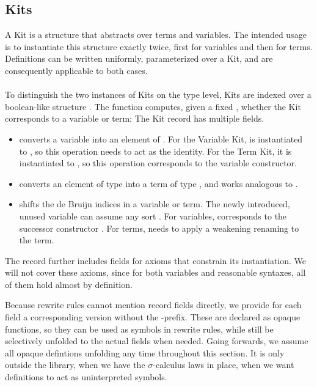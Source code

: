 \documentclass[screen,nonacm]{acmart}
\begin{document}
\subsection{Kits}\label{sec:ags-kit}
A Kit is a structure that abstracts over terms and variables. The intended
usage is to instantiate this structure exactly twice, first for variables and
then for terms. Definitions can be written uniformly, parameterized over a Kit,
and are consequently applicable to both cases. \AKit{}\AOpenKit{}\\\\To
distinguish the two instances of Kits on the type level, Kits are indexed over
a boolean-like structure \AModeDef. The  function computes,
given a fixed , whether the Kit corresponds to a variable or
term: \AImage{}The Kit record has multiple fields.
\begin{itemize}
      \item {} converts a variable into an element of   .
            For the Variable Kit,  is instantiated to , so this operation needs to act as the identity.
            For the Term Kit, it is instantiated to , so this operation corresponds to the variable constructor.
      \item {} converts an element of type    into a term of type   , and works analogous to .
      \item {} shifts the de Bruijn indices in a variable or term.
            The newly introduced, unused variable  can assume any sort .
            For variables,  corresponds to the successor constructor .
            For terms,  needs to apply a weakening renaming to the term.
\end{itemize}

The  record further includes fields for axioms that constrain
its instantiation. We will not cover these axioms, since for both variables and
reasonable syntaxes, all of them hold almost by definition.

Because rewrite rules cannot mention record fields directly, we provide for
each field a corresponding version without the -prefix. These are
declared as opaque functions, so they can be used as symbols in rewrite rules,
while still be selectively unfolded to the actual fields when needed. Going
forwards, we assume all opaque defintions unfolding any time throughout this
section. It is only outside the library, when we have the $σ$-calculus laws in
place, when we want definitions to act as uninterpreted symbols.
\end{document}
